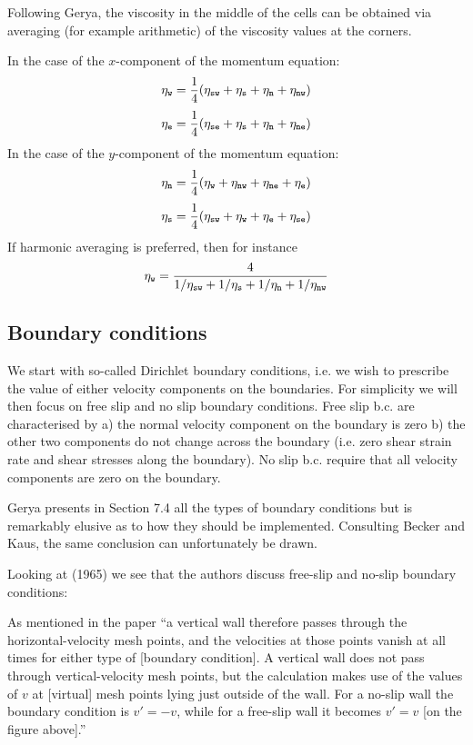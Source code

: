 Following Gerya, the viscosity in the middle of the cells
can be obtained via averaging (for example arithmetic) of the viscosity values at the corners.

In the case of the $x$-component of the momentum equation:
\[
\eta_{\tt w} = \frac{1}{4}(\eta_{\tt sw}+\eta_{\tt s}+\eta_{\tt n} + \eta_{\tt nw})
\]
\[
\eta_{\tt e} = \frac{1}{4}(\eta_{\tt se}+\eta_{\tt s}+\eta_{\tt n} + \eta_{\tt ne})
\]
In the case of the $y$-component of the momentum equation:
\[
\eta_{\tt n} = \frac{1}{4}(\eta_{\tt w}+\eta_{\tt nw}+\eta_{\tt ne} + \eta_{\tt e})
\]
\[
\eta_{\tt s} = \frac{1}{4}(\eta_{\tt sw}+\eta_{\tt w}+\eta_{\tt e} + \eta_{\tt se})
\]
If harmonic averaging is preferred, then for instance
\[
\eta_{\tt w} = \frac{4}{1/\eta_{\tt sw}+1/\eta_{\tt s}+1/\eta_{\tt n} + 1/\eta_{\tt nw} }
\]


\subsection{Boundary conditions}

We start with so-called Dirichlet boundary conditions, i.e. we wish 
to prescribe the value of either velocity components on the boundaries.
For simplicity we will then focus on free slip and no slip boundary conditions.
Free slip b.c. are characterised by a) the normal velocity component on the boundary is zero 
b) the other two components do not change across the boundary (i.e.
zero shear strain rate and shear stresses along the boundary).
No slip b.c. require that all velocity components are zero on the boundary.

Gerya presents in Section 7.4 all the types of boundary conditions but is remarkably elusive 
as to how they should be implemented. Consulting Becker and Kaus, the same conclusion can 
unfortunately be drawn.

Looking at \textcite{hawe65} (1965)
we see that the authors discuss free-slip and no-slip boundary conditions:
\begin{center}
\end{center}
As mentioned in the paper ``a vertical wall therefore passes through the horizontal-velocity mesh points,
and the velocities at those points vanish at all times for either type of [boundary condition].
A vertical wall does not pass through vertical-velocity mesh points, but the calculation makes use
of the values of $v$ at [virtual] mesh points lying just outside of the wall. For a no-slip wall
the boundary condition is $v'=-v$, while for a free-slip wall it becomes $v'=v$ [on the figure above].''

